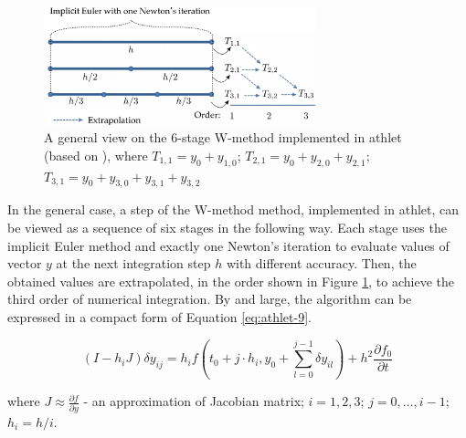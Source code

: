 \begin{figure}[!b]
  \centering
  \includegraphics[width=0.7\textwidth]{figures/introduction-rosenbrock-scheme.png}
\caption[A general view of the 6-stage W-method implemented in \acrshort{athlet}]{A general view on the 6-stage W-method implemented in \acrshort{athlet} (based on \cite{tims-presentation}), where $T_{1,1} = y_{0} + y_{1,0}$; $T_{2,1} = y_{0} + y_{2,0} + y_{2,1}$; $T_{3,1} = y_{0} + y_{3,0} + y_{3,1} + y_{3,2}$ 
}

\label{fig:introduction-w-method-scheme}
\end{figure}

In the general case, a step of the W-method method, implemented in \acrshort{athlet}, can be viewed as a sequence of six stages in the following way. Each stage uses the implicit Euler method and exactly one Newton's iteration to evaluate values of vector $y$ at the next integration step $h$ with different accuracy. Then, the obtained values are extrapolated, in the order shown in Figure \ref{fig:introduction-w-method-scheme}, to achieve the third order of numerical integration. By and large, the algorithm can be expressed in a compact form of Equation \ref{eq:athlet-9}.


 \begin{equation} \label{eq:athlet-9}
        (I - h_{i}J)\delta y_{ij} = h_{i} f(t_{0} + j \cdot h_{i}, y_{0} + \sum^{j-1}_{l = 0} \delta y_{il}) + h^{2} \frac{\partial f_{0}}{\partial t}
    \end{equation}

where $J \approx \frac{\partial f}{\partial y}$ - an approximation of Jacobian matrix; $i = 1, 2, 3$; $j=0, \dots, i - 1$; $h_{i} = h / i$.



